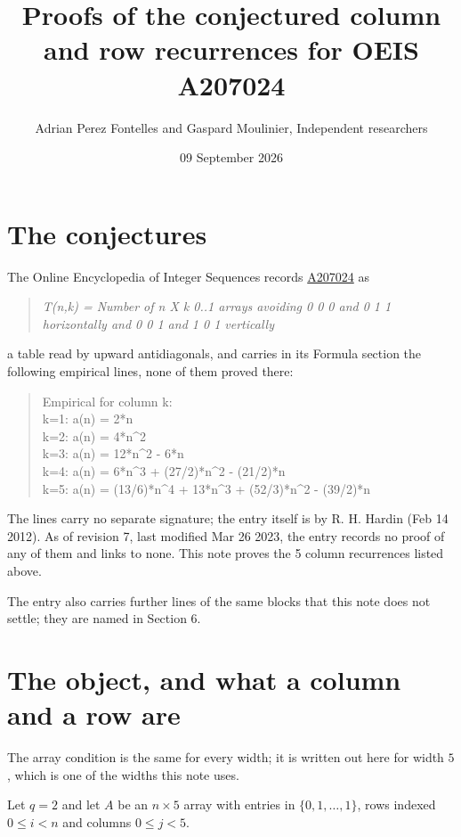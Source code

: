 \documentclass[11pt]{article}
\title{Proofs of the conjectured column and row recurrences for OEIS A207024}
\author{Adrian Perez Fontelles and Gaspard Moulinier, Independent researchers}
\date{09 September 2026}
\theoremstyle{definition}
\begin{document}
\maketitle
\section{The conjectures}

The Online Encyclopedia of Integer Sequences records \href{https://oeis.org/A207024}{A207024} as

\begin{quote}\itshape T(n,k) = Number of n X k 0..1 arrays avoiding 0 0 0 and 0 1 1 horizontally and 0 0 1 and 1 0 1 vertically\end{quote}

a table read by upward antidiagonals, and carries in its Formula section the following empirical lines, none of them proved there:

\begin{quote}\ttfamily Empirical for column k:\\
k=1: a(n) = 2*n\\k=2: a(n) = 4*n\textasciicircum{}2\\k=3: a(n) = 12*n\textasciicircum{}2 - 6*n\\k=4: a(n) = 6*n\textasciicircum{}3 + (27/2)*n\textasciicircum{}2 - (21/2)*n\\k=5: a(n) = (13/6)*n\textasciicircum{}4 + 13*n\textasciicircum{}3 + (52/3)*n\textasciicircum{}2 - (39/2)*n\end{quote}

The lines carry no separate signature; the entry itself is by R. H. Hardin (Feb 14 2012). As of revision 7, last modified Mar 26 2023, the entry records no proof of any of them and links to none. This note proves the 5 column recurrences listed above.

The entry also carries further lines of the same blocks that this note does not settle; they are named in Section 6.

\section{The object, and what a column and a row are}

The array condition is the same for every width; it is written out here for width $5$, which is one of the widths this note uses.

Let $q = 2$ and let $A$ be an $n \times 5$ array with entries in $\{0,1,\dots,1\}$, rows indexed $0 \le i < n$ and columns $0 \le j < 5$.
\end{document}
